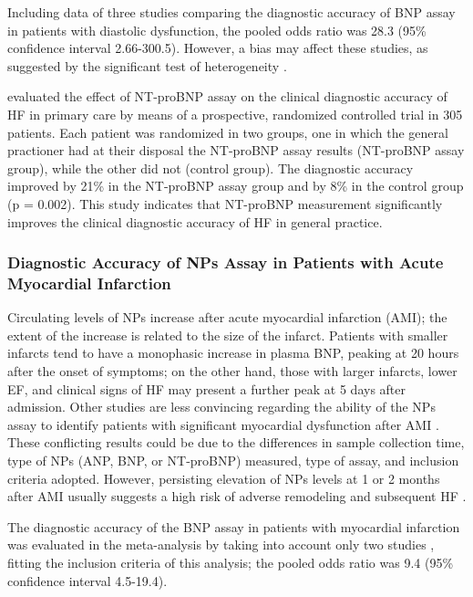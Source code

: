 \documentclass[14pt,a4paper,onecolumn]{extarticle}
\begin{document}
Including data of three studies comparing the diagnostic accuracy of BNP assay in patients with diastolic dysfunction, the pooled odds ratio was 28.3 (95\% confidence interval 2.66-300.5). However, a bias may affect these studies, as suggested by the significant test of heterogeneity \citep{bib372}.

\citep{bib3133} evaluated the effect of NT-proBNP assay on the clinical diagnostic accuracy of HF in primary care by means of a prospective, randomized controlled trial in 305 patients. Each patient was randomized in two groups, one in which the general practioner had at their disposal the NT-proBNP assay results (NT-proBNP assay group), while the other did not (control group). The diagnostic accuracy improved by 21\% in the NT-proBNP assay group and by 8\% in the control group (p = 0.002). This study indicates that NT-proBNP measurement significantly improves the clinical diagnostic accuracy of HF in general practice.

\subsubsection{Diagnostic Accuracy of NPs Assay in Patients with Acute Myocardial Infarction}

Circulating levels of NPs increase after acute myocardial infarction (AMI); the extent of the increase is related to the size of the infarct. Patients with smaller infarcts tend to have a monophasic increase in plasma BNP, peaking at 20 hours after the onset of symptoms; on the other hand, those with larger infarcts, lower EF, and clinical signs of HF may present a further peak at 5 days after admission. Other studies are less convincing regarding the ability of the NPs assay to identify patients with significant myocardial dysfunction after AMI \citep{bib3139}. These conflicting results could be due to the differences in sample collection time, type of NPs (ANP, BNP, or NT-proBNP) measured, type of assay, and inclusion criteria adopted. However, persisting elevation of NPs levels at 1 or 2 months after AMI usually suggests a high risk of adverse remodeling and subsequent HF \citep{bib35}.

The diagnostic accuracy of the BNP assay in patients with myocardial infarction was evaluated in the meta-analysis by \citep{bib372} taking into account only two studies \citep{bib3140} \citep{bib3177}, fitting the inclusion criteria of this analysis; the pooled odds ratio was 9.4 (95\% confidence interval 4.5-19.4).
\end{document}
